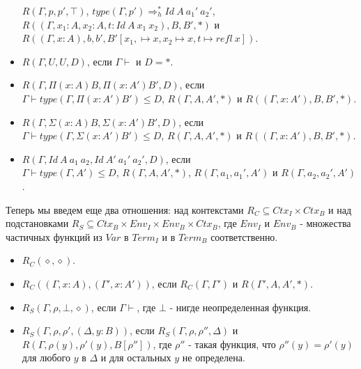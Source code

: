 \documentclass{amsart}
\theoremstyle{definition}
\theoremstyle{remark}
\newcommand{\red}{\Rightarrow}
\numberwithin{figure}{section}
\begin{document}
\begin{itemize}
    $R(\Gamma, p, p', \top)$,
    $type(\Gamma, p') \red_h^* Id\ A\ a_1'\ a_2'$, \\
    $R((\Gamma, x_1 : A, x_2 : A, t : Id\ A\ x_1\ x_2), B, B', *)$ и \\
    $R((\Gamma, x : A), b, b', B'[x_1, \mapsto x, x_2 \mapsto x, t \mapsto refl\ x])$.
\item $R(\Gamma, U, U, D)$, если $\Gamma \vdash$ и $D = *$.
\item $R(\Gamma, \Pi (x : A) B, \Pi (x : A') B', D)$, если \\
    $\Gamma \vdash type(\Gamma, \Pi (x : A') B') \leq D$, $R(\Gamma, A, A', *)$ и $R((\Gamma, x : A'), B, B', *)$.
\item $R(\Gamma, \Sigma (x : A) B, \Sigma (x : A') B', D)$, если \\
    $\Gamma \vdash type(\Gamma, \Sigma (x : A') B') \leq D$, $R(\Gamma, A, A', *)$ и $R((\Gamma, x : A'), B, B', *)$.
\item $R(\Gamma, Id\ A\ a_1\ a_2, Id\ A'\ a_1'\ a_2', D)$, если \\
    $\Gamma \vdash type(\Gamma, A') \leq D$, $R(\Gamma, A, A', *)$, $R(\Gamma, a_1, a_1', A')$ и $R(\Gamma, a_2, a_2', A')$.
\end{itemize}

Теперь мы введем еще два отношения: над контекстами $R_C \subseteq Ctx_I \times Ctx_B$ и над подстановками $R_S \subseteq Ctx_B \times Env_I \times Env_B \times Ctx_B$,
где $Env_I$ и $Env_B$ - множества частичных функций из $Var$ в $Term_I$ и в $Term_B$ соответственно.
\begin{itemize}
\item $R_C(\diamond, \diamond)$.
\item $R_C((\Gamma, x : A), (\Gamma', x : A'))$, если $R_C(\Gamma, \Gamma')$ и $R(\Gamma', A, A', *)$.
\end{itemize}
\begin{itemize}
\item $R_S(\Gamma, \rho, \bot, \diamond)$, если $\Gamma \vdash$, где $\bot$ - нигде неопределенная функция.
\item $R_S(\Gamma, \rho, \rho', (\Delta, y : B))$, если $R_S(\Gamma, \rho, \rho'', \Delta)$ и $R(\Gamma, \rho(y), \rho'(y), B[\rho''])$,
    где $\rho''$ - такая функция, что $\rho''(y) = \rho'(y)$ для любого $y$ в $\Delta$ и для остальных $y$ не определена.
\end{itemize}
\end{document}
